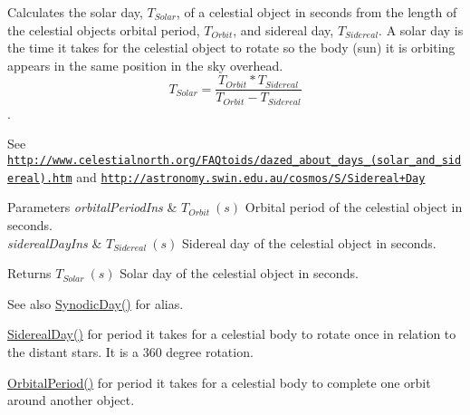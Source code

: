Calculates the solar day, $T_{Solar}$, of a celestial object in seconds from the length of the celestial object\textquotesingle{}s orbital period, $T_{Orbit}$, and sidereal day, $T_{Sidereal}$. A solar day is the time it takes for the celestial object to rotate so the body (sun) it is orbiting appears in the same position in the sky overhead. \[ T_{Solar}=\dfrac{T_{Orbit} * T_{Sidereal}}{T_{Orbit} - T_{Sidereal}}\]. 

See \href{http://www.celestialnorth.org/FAQtoids/dazed_about_days_(solar_and_sidereal).htm}{\tt http\+://www.\+celestialnorth.\+org/\+F\+A\+Qtoids/dazed\+\_\+about\+\_\+days\+\_\+(solar\+\_\+and\+\_\+sidereal).\+htm} and \href{http://astronomy.swin.edu.au/cosmos/S/Sidereal+Day}{\tt http\+://astronomy.\+swin.\+edu.\+au/cosmos/\+S/\+Sidereal+\+Day}


\begin{DoxyParams}{Parameters}
{\em orbital\+Period\+Ins} & $ T_{Orbit}\ (s)$ Orbital period of the celestial object in seconds. \\
\hline
{\em sidereal\+Day\+Ins} & $ T_{Sidereal}\ (s)$ Sidereal day of the celestial object in seconds. \\
\hline
\end{DoxyParams}
\begin{DoxyReturn}{Returns}
$ T_{Solar}\ (s)$ Solar day of the celestial object in seconds. 
\end{DoxyReturn}
\begin{DoxySeeAlso}{See also}
\mbox{\hyperlink{group___e_g_x_phys-_astrophysic-_synodic_day_ga637140842bc008c87d90e65b551cbac7}{Synodic\+Day()}} for alias. 

\mbox{\hyperlink{group___e_g_x_phys-_astrophysic-_sidereal_day_ga587900d5fc755228c1bb5121cd7965c6}{Sidereal\+Day()}} for period it takes for a celestial body to rotate once in relation to the distant stars. It is a 360 degree rotation. 

\mbox{\hyperlink{group___e_g_x_phys-_astrophysic-_orbital_period_ga76aac7afe3b7a30a785259e9eeb0c139}{Orbital\+Period()}} for period it takes for a celestial body to complete one orbit around another object. 
\end{DoxySeeAlso}
